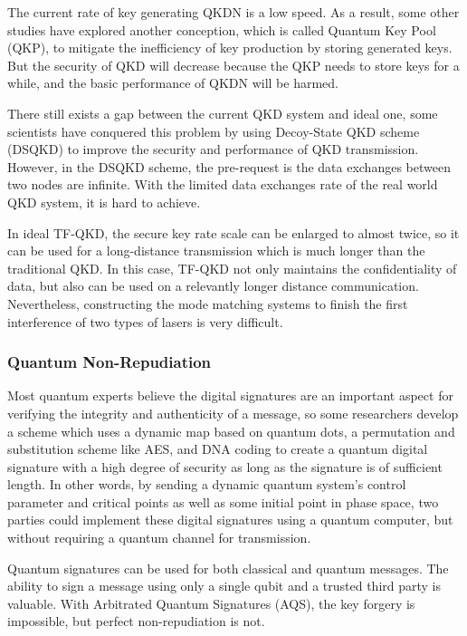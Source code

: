 \documentclass[sigconf]{acmart}
\begin{document}
The current rate of key generating QKDN is a low speed. As a result, some other studies have explored another conception, which is called Quantum Key Pool (QKP), to mitigate the inefficiency of key production by storing generated keys. But the security of QKD will decrease because the QKP needs to store keys for a while, and the basic performance of QKDN will be harmed\cite{liu_multi-path_2019}.

There still exists a gap between the current QKD system and ideal one, some scientists have conquered this problem by using Decoy-State QKD scheme (DSQKD) to improve the security and performance of QKD transmission. However, in the DSQKD scheme, the pre-request is the data exchanges between two nodes are infinite. With the limited data exchanges rate of the real world QKD system, it is hard to achieve\cite{yu_study_2020}.

In ideal TF-QKD, the secure key rate scale can be enlarged to almost twice, so it can be used for a long-distance transmission which is much longer than the traditional QKD. In this case, TF-QKD not only maintains the confidentiality of data, but also can be used on a relevantly longer distance communication. Nevertheless, constructing the mode matching systems to finish the first interference of two types of lasers is very difficult\cite{park_research_2020}.


\subsubsection{Quantum Non-Repudiation}
Most quantum experts believe the digital signatures are an important aspect for verifying the integrity and authenticity of a message, so some researchers develop a scheme which uses a dynamic map based on quantum dots, a permutation and substitution scheme like AES, and DNA coding to create a quantum digital signature with a high degree of security as long as the signature is of sufficient length. In other words, by sending a dynamic quantum system's control parameter and critical points as well as some initial point in phase space, two parties could implement these digital signatures using a quantum computer, but without requiring a quantum channel for transmission\cite{hematpour_presence_2020}.

Quantum signatures can be used for both classical and quantum messages. The ability to sign a message using only a single qubit and a trusted third party is valuable. With Arbitrated Quantum Signatures (AQS), the key forgery is impossible, but perfect non-repudiation is not\cite{kang_quantum_2015}.
\end{document}
